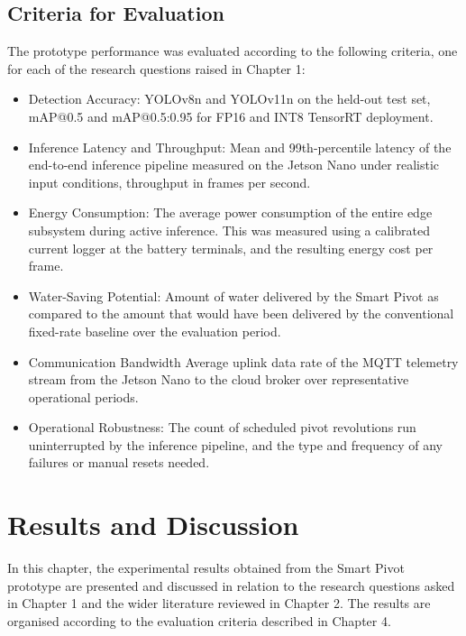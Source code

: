\documentclass[12pt,a4paper]{report}
\begin{document}
\section{Criteria for Evaluation}

The prototype performance was evaluated according to the following criteria, one for each of the research questions raised in Chapter 1:

\begin{itemize}
    \item Detection Accuracy: YOLOv8n and YOLOv11n on the held-out test set, mAP@0.5 and mAP@0.5:0.95 for FP16 and INT8 TensorRT deployment.
    \item Inference Latency and Throughput: Mean and 99th-percentile latency of the end-to-end inference pipeline measured on the Jetson Nano under realistic input conditions, throughput in frames per second.
    \item Energy Consumption: The average power consumption of the entire edge subsystem during active inference. This was measured using a calibrated current logger at the battery terminals, and the resulting energy cost per frame.
    \item Water-Saving Potential: Amount of water delivered by the Smart Pivot as compared to the amount that would have been delivered by the conventional fixed-rate baseline over the evaluation period.
    \item Communication Bandwidth Average uplink data rate of the MQTT telemetry stream from the Jetson Nano to the cloud broker over representative operational periods.
    \item Operational Robustness: The count of scheduled pivot revolutions run uninterrupted by the inference pipeline, and the type and frequency of any failures or manual resets needed.
\end{itemize}

\chapter{Results and Discussion}
\pagestyle{fancy}
\thispagestyle{empty}

In this chapter, the experimental results obtained from the Smart Pivot prototype are presented and discussed in relation to the research questions asked in Chapter 1 and the wider literature reviewed in Chapter 2. The results are organised according to the evaluation criteria described in Chapter 4.
\end{document}
